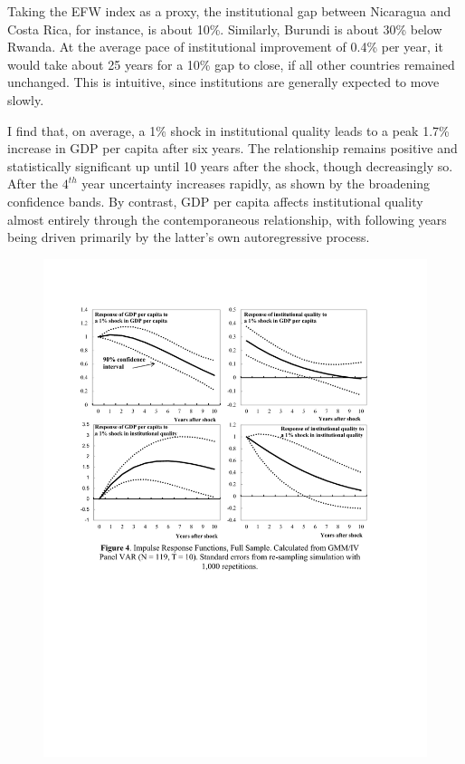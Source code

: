\documentclass{article}
\begin{document}
Taking the EFW index as a proxy, the institutional gap between Nicaragua and Costa Rica, for instance, is about 10\%. Similarly, Burundi is about 30\% below Rwanda. At the average pace of institutional improvement of 0.4\% per year, it would take about 25 years for a 10\% gap to close, if all other countries remained unchanged. This is intuitive, since institutions are generally expected to move slowly.

I find that, on average, a 1\% shock in institutional quality leads to a peak 1.7\% increase in GDP per capita after six years. The relationship remains positive and statistically significant up until 10 years after the shock, though decreasingly so. After the $4^{th}$ year uncertainty increases rapidly, as shown by the broadening confidence bands. By contrast, GDP per capita affects institutional quality almost entirely through the contemporaneous relationship, with following years being driven primarily by the latter's own autoregressive process.

\newpage

\begin{figure}[!hb]
\begin{center}
    \includegraphics[scale=0.675]{whole.pdf}
\end{center}
\end{figure}
\end{document}
